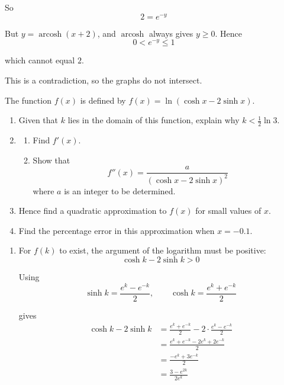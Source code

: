 \documentclass[leqno]{article}
\begin{document}
\begin{enumerate}[
  label=\textbf{\arabic*.},
  leftmargin=*,
  topsep=0pt,
  partopsep=0pt,
  parsep=0pt
]
\begin{djsSolution}
\begin{enumerate}[label=\textbf{(\alph*)}]
So
\[
2=e^{-y}
\]

But \(y=\operatorname{arcosh}(x+2)\), and \(\operatorname{arcosh}\) always gives \(y\geq 0\). Hence
\[
0<e^{-y}\leq 1
\]

which cannot equal \(2\).

This is a contradiction, so the graphs do not intersect.

\end{enumerate}
\end{djsSolution}


\newpage

\questionitem

The function $f(x)$ is defined by $f(x)=\ln(\cosh x-2\sinh x)$. \\
\begin{enumerate}[label=\textbf{(\alph*)}]
  \item Given that $k$ lies in the domain of this function, explain why $k<\frac{1}{2}\ln 3$.  \\
  \item
  \begin{enumerate}[label=(\roman*)]
    \item Find $f'(x)$. 
    \item Show that
    \[
    f''(x)=\frac{a}{(\cosh x-2\sinh x)^2}
    \]
    where $a$ is an integer to be determined.  \\
  \end{enumerate}
  \item Hence find a quadratic approximation to $f(x)$ for small values of $x$.  \\
  \item Find the percentage error in this approximation when $x=-0.1$.  \\
\end{enumerate}

\vspace*{10pt}

\begin{djsSolution}
\begin{enumerate}[label=\textbf{(\alph*)}]
  \item For $f(k)$ to exist, the argument of the logarithm must be positive:
\[
\cosh k-2\sinh k>0
\]

Using
\[
\sinh k=\frac{e^k-e^{-k}}{2},\qquad \cosh k=\frac{e^k+e^{-k}}{2}
\]

gives
\begin{align*}
\cosh k-2\sinh k
&=\frac{e^k+e^{-k}}{2}-2\cdot \frac{e^k-e^{-k}}{2} \\
&=\frac{e^k+e^{-k}-2e^k+2e^{-k}}{2} \\
&=\frac{-e^k+3e^{-k}}{2} \\
&=\frac{3-e^{2k}}{2e^k}
\end{align*}


\end{enumerate}
\end{djsSolution}
\end{enumerate}
\end{document}
